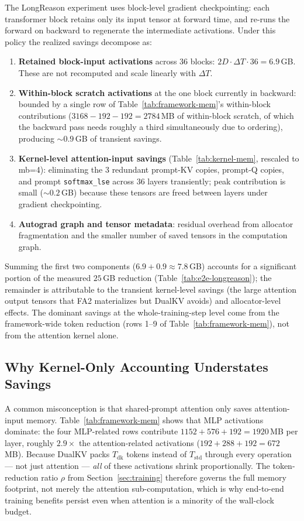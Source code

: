 \documentclass{article}
\begin{document}
The LongReason experiment uses block-level gradient checkpointing: each transformer block retains only its input tensor at forward time, and re-runs the forward on backward to regenerate the intermediate activations. Under this policy the realized savings decompose as:

\begin{enumerate}
  \item \textbf{Retained block-input activations} across 36 blocks: $2 D \cdot \Delta T \cdot 36 = 6.9$\,GB. These are not recomputed and scale linearly with $\Delta T$.
  \item \textbf{Within-block scratch activations} at the one block currently in backward: bounded by a single row of Table~\ref{tab:framework-mem}'s within-block contributions ($3168 - 192 - 192 = 2784$\,MB of within-block scratch, of which the backward pass needs roughly a third simultaneously due to ordering), producing ${\sim}0.9$\,GB of transient savings.
  \item \textbf{Kernel-level attention-input savings} (Table~\ref{tab:kernel-mem}, rescaled to mb=4): eliminating the 3 redundant prompt-KV copies, prompt-Q copies, and prompt \texttt{softmax\_lse} across 36 layers transiently; peak contribution is small (${\sim}0.2$\,GB) because these tensors are freed between layers under gradient checkpointing.
  \item \textbf{Autograd graph and tensor metadata}: residual overhead from allocator fragmentation and the smaller number of saved tensors in the computation graph.
\end{enumerate}

Summing the first two components ($6.9 + 0.9 \approx 7.8$\,GB) accounts for a significant portion of the measured $25$\,GB reduction (Table~\ref{tab:e2e-longreason}); the remainder is attributable to the transient kernel-level savings (the large attention output tensors that FA2 materializes but DualKV avoids) and allocator-level effects. The dominant savings at the whole-training-step level come from the framework-wide token reduction (rows 1--9 of Table~\ref{tab:framework-mem}), not from the attention kernel alone.

\subsection{Why Kernel-Only Accounting Understates Savings}

A common misconception is that shared-prompt attention only saves attention-input memory. Table~\ref{tab:framework-mem} shows that MLP activations dominate: the four MLP-related rows contribute $1152 + 576 + 192 = 1920$\,MB per layer, roughly $2.9\times$ the attention-related activations ($192 + 288 + 192 = 672$\,MB). Because DualKV packs $T_{\text{dk}}$ tokens instead of $T_{\text{std}}$ through every operation --- not just attention --- \emph{all} of these activations shrink proportionally. The token-reduction ratio $\rho$ from Section~\ref{sec:training} therefore governs the full memory footprint, not merely the attention sub-computation, which is why end-to-end training benefits persist even when attention is a minority of the wall-clock budget.
\end{document}
